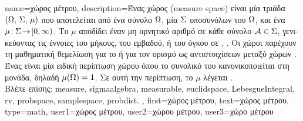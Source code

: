 {name={\foreignlanguage{greek}{χώρος μέτρου}},
	description={\foreignlanguage{greek}{Ένας χώρος}  
		(measure space) \foreignlanguage{greek}{είναι μία τριάδα $(\Omega, \,\Sigma, \,\mu)$ που αποτελείται 
		από ένα σύνολο} $\Omega$, \foreignlanguage{greek}{μία}  $\Sigma$ 
		\foreignlanguage{greek}{υποσυνόλων του $\Omega$, και ένα}  $\mu\!:\Sigma\!\to\![0,\infty)$. 
		\foreignlanguage{greek}{Το}  $\mu$ \foreignlanguage{greek}{αποδίδει έναν μη αρνητικό αριθμό 
		σε κάθε}  \foreignlanguage{greek}{σύνολο $\mathcal{A} \in \Sigma$, γενικεύοντας 
		τις έννοιες του μήκους, του εμβαδού, ή του όγκου σε}  
		\cite{RudinBookPrinciplesMatheAnalysis}, \cite{HalmosMeasure}. 
		\foreignlanguage{greek}{Οι χώροι}  \foreignlanguage{greek}{παρέχουν τη μαθηματική θεμελίωση 
		για το}  \foreignlanguage{greek}{ή για τον ορισμό}  
		\foreignlanguage{greek}{ως}  \foreignlanguage{greek}{αντιστοιχίσεων μεταξύ χώρων}  
        		. \foreignlanguage{greek}{Ένας}  \foreignlanguage{greek}{είναι μία 
		ειδική περίπτωση χώρου}  \foreignlanguage{greek}{όπου το συνολικό}  
		\foreignlanguage{greek}{του}  \foreignlanguage{greek}{κανονικοποιείται στη μονάδα, 
		δηλαδή $\mu(\Omega) = 1$. Σε αυτή την περίπτωση, το $\mu$ λέγεται} .
		\\ 
		\foreignlanguage{greek}{Βλέπε επίσης:} \gls{measure}, \gls{sigmaalgebra}, \gls{measurable}, \gls{euclidspace}, 
		\gls{LebesgueIntegral}, \gls{rv}, \gls{probspace}, \gls{samplespace}, \gls{probdist}. },
    	first={\foreignlanguage{greek}{χώρος μέτρου}},
    	text={\foreignlanguage{greek}{χώρος μέτρου}},
	type=math,
	user1={\foreignlanguage{greek}{χώρος μέτρου}}, %
  	user2={\foreignlanguage{greek}{χώρου μέτρου}}, %
	user3={\foreignlanguage{greek}{χώρο μέτρου}} %
}%


